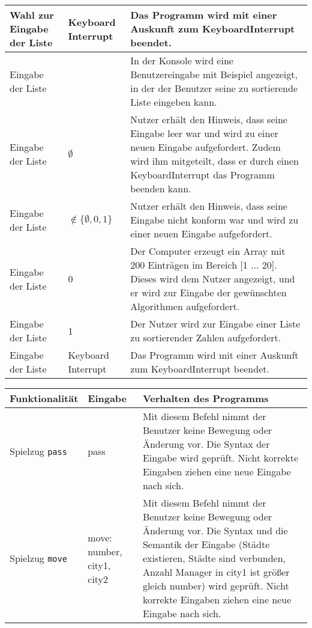 \documentclass[a4paper]{article}
\begin{document}
\begin{exercise}{1}
\begin{center}
\begin{tabular}{| p{2.5cm} | p{2.2cm} | p{10cm} |}
		Wahl zur Eingabe der Liste & Keyboard Interrupt
		& Das Programm wird mit einer Auskunft zum KeyboardInterrupt beendet.\\ \hline
		
		Eingabe der Liste & 
		& In der Konsole wird eine Benutzereingabe mit Beispiel angezeigt, in der der Benutzer
		seine zu sortierende Liste eingeben kann. \\ \hline
		
		Eingabe der Liste & $\emptyset$
		& Nutzer erh\"alt den Hinweis, dass seine Eingabe leer war und wird zu einer neuen Eingabe
		aufgefordert. Zudem wird ihm mitgeteilt, dass er durch einen KeyboardInterrupt das Programm
		beenden kann. \\ \hline
		
		Eingabe der Liste & $\notin \{\emptyset, 0, 1\}$
		& Nutzer erh\"alt den Hinweis, dass seine Eingabe nicht konform war und wird zu einer
		neuen Eingabe aufgefordert.\\ \hline
		
		Eingabe der Liste & 0
		& Der Computer erzeugt ein Array mit 200 Eintr\"agen im Bereich [1 ... 20]. Dieses wird dem
		Nutzer angezeigt, und er wird zur Eingabe der gew\"unschten Algorithmen aufgefordert.\\ \hline
		
		Eingabe der Liste & 1
		& Der Nutzer wird zur Eingabe einer Liste zu sortierender Zahlen aufgefordert.\\ \hline
		
		Eingabe der Liste & Keyboard Interrupt
		& Das Programm wird mit einer Auskunft zum KeyboardInterrupt beendet.\\ \hline

		\end{tabular}

	\begin{tabular}{| p{2.5cm} | p{2.2cm} | p{10cm} |}
		\hline
		Funktionalit\"at & Eingabe & Verhalten des Programms\\ \hline \hline
		
		Spielzug \texttt{pass} & pass
		& Mit diesem Befehl nimmt der Benutzer keine Bewegung oder \"Anderung vor.
		Die Syntax der Eingabe wird gepr\"uft. Nicht korrekte Eingaben ziehen eine neue Eingabe
		nach sich. \\ \hline
		
		Spielzug \texttt{move} & move: number, city1, city2
		& Mit diesem Befehl nimmt der Benutzer keine Bewegung oder \"Anderung vor.
		Die Syntax und die Semantik der Eingabe (St\"adte existieren, St\"adte sind verbunden,
		Anzahl Manager in city1 ist gr\"o\ss{}er gleich number) wird gepr\"uft. Nicht korrekte Eingaben
		ziehen eine neue Eingabe nach sich. \\ \hline
		

\end{tabular}
\end{center}
\end{exercise}
\end{document}
